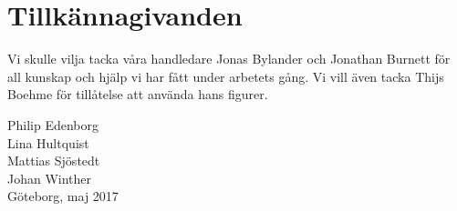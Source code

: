 \documentclass[../../main.tex]{subfiles}
\begin{document}
\thispagestyle{plain}			%
\section*{Tillkännagivanden}

Vi skulle vilja tacka våra handledare Jonas Bylander och Jonathan Burnett för all kunskap och hjälp vi har fått under arbetets gång. Vi vill även tacka Thijs Boehme för tillåtelse att använda hans figurer.


\vspace{1.5cm}
\hfill
\begin{center}
Philip Edenborg\\Lina Hultquist\\Mattias Sjöstedt\\Johan Winther\\ Göteborg, maj 2017
\end{center}

\newpage\null\thispagestyle{empty}\newpage
\end{document}
